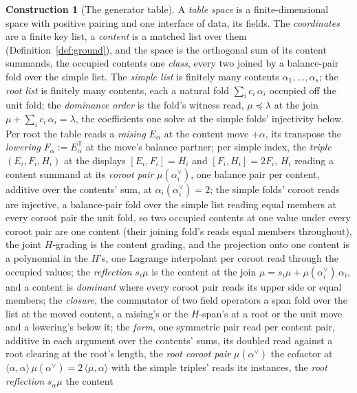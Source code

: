 \documentclass[11pt]{article}
\theoremstyle{definition}
\newtheorem{construction}{Construction}
\begin{document}
\begin{construction}[The generator table]\label{con:gentable}
A \emph{table space} is a finite-dimensional space with positive
pairing and one interface of data, its fields. The
\emph{coordinates} are a finite key list, a \emph{content} is a
matched list over them (Definition~\ref{def:ground}), and the
space is the orthogonal sum of its content summands, the occupied
contents one \emph{class}, every two joined by a balance-pair
fold over the simple list. The
\emph{simple list} is finitely many contents
$\alpha_1,\dots,\alpha_s$; the \emph{root list} is finitely many
contents, each a natural fold $\sum_ic_i\,\alpha_i$ occupied off
the unit fold; the \emph{dominance order} is the fold's witness
read, $\mu\preceq\lambda$ at the join
$\mu+\sum_ic_i\,\alpha_i=\lambda$, the coefficients one solve at
the simple folds' injectivity below. Per root the table reads a
\emph{raising} $E_\alpha$ at the content move $+\alpha$, its
transpose the \emph{lowering} $F_\alpha:=E_\alpha^{\mathsf T}$ at
the move's balance partner; per simple index, the \emph{triple}
$(E_i,F_i,H_i)$ at the displays $[E_i,F_i]=H_i$ and
$[F_i,H_i]=2F_i$, $H_i$ reading a content summand at its
\emph{coroot pair} $\mu(\alpha_i^\vee)$, one balance pair per
content, additive over the contents' sum, at
$\alpha_i(\alpha_i^\vee)=2$; the simple folds' coroot reads are
injective, a balance-pair fold over the simple list reading equal
members at every coroot pair the unit fold, so two occupied
contents at one value under every coroot pair are one content
(their joining fold's reads equal members throughout), the joint
$H$-grading is the content grading, and the projection onto one
content is a polynomial in the $H$'s, one Lagrange interpolant
per coroot read through the occupied values; the \emph{reflection}
$s_i\mu$ is the content at the join
$\mu=s_i\mu+\mu(\alpha_i^\vee)\,\alpha_i$, and a content is
\emph{dominant} where every coroot pair reads its upper side or
equal members; the \emph{closure}, the commutator of two field
operators a span fold over the list at the moved content, a
raising's or the $H$-span's at a root or the unit move and a
lowering's below it; the \emph{form}, one symmetric pair read per
content pair, additive in each argument over the contents' sums,
its doubled read against a root clearing at the root's length,
the \emph{root coroot pair} $\mu(\alpha^\vee)$ the cofactor at
$\langle\alpha,\alpha\rangle\,\mu(\alpha^\vee)
=2\,\langle\mu,\alpha\rangle$ with the simple triples' reads its
instances, the \emph{root reflection} $s_\alpha\mu$ the content

\end{construction}
\end{document}
